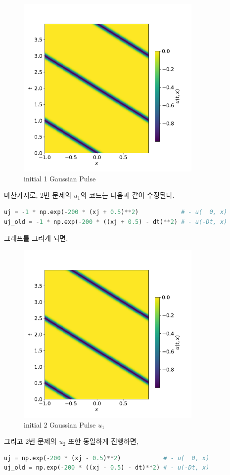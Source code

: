 \documentclass[11pt]{article}
\begin{document}
\begin{figure}[!ht]
  \centering
  \includegraphics[width=0.8\textwidth]{1d_Wave_Solution.pdf}
  \caption{initial 1 Gaussian Pulse}
\end{figure}

마찬가지로, 2번 문제의 $u_1$의 코드는 다음과 같이 수정된다.
\begin{lstlisting}[language=Python]
uj = -1 * np.exp(-200 * (xj + 0.5)**2)            # - u(  0, x)
uj_old = -1 * np.exp(-200 * ((xj + 0.5) - dt)**2) # - u(-Dt, x)
\end{lstlisting}
그래프를 그리게 되면,

\begin{figure}[!ht]
  \centering
  \includegraphics[width=0.8\textwidth]{1d_Wave_Solution2_u1.pdf}
  \caption{initial 2 Gaussian Pulse $u_1$}
\end{figure}
그리고 2번 문제의 $u_2$ 또한 동일하게 진행하면,
\begin{lstlisting}[language=Python]
uj = np.exp(-200 * (xj - 0.5)**2)            # - u(  0, x)
uj_old = np.exp(-200 * ((xj - 0.5) - dt)**2) # - u(-Dt, x)
\end{lstlisting}
\end{document}
